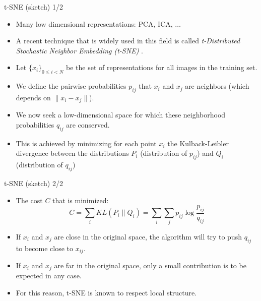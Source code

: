 \documentclass[xcolor=pdftex,dvipsnames,table]{beamer}
\begin{document}
\begin{frame}{t-SNE (sketch) 1/2}
\begin{itemize}
	\item Many low dimensional representations: PCA, ICA, $\ldots$
	\item A recent technique that is widely used in this field is called \emph{t-Distributed Stochastic Neighbor Embedding (t-SNE)} \cite{Maaten:2008}. 
	\item Let $\{x_i\}_{0\leq i < N}$ be the set of representations for all images in the training set. 
	\item We define the pairwise probabilities $p_{ij}$ that $x_i$ and $x_j$ are neighbors (which depends on $\|x_i-x_j\|$). 
	\item We now seek a low-dimensional space for which these neighborhood probabilities $q_{ij}$ are conserved. 
	\item This is achieved by minimizing for each point $x_i$ the Kulback-Leibler divergence between the distributions $P_i$ (distribution of $p_{ij}$) and $Q_i$ (distribution of $q_{ij}$)
\end{itemize}
\end{frame}

\begin{frame}{t-SNE (sketch) 2/2}
\begin{itemize}
	\item The cost $C$ that is minimized: 
	\begin{equation}
		C = \sum_i KL(P_i\|Q_i) = \sum_i \sum_j p_{ij}\log{\frac{p_{ij}}{q_{ij}}}
	\end{equation}
	\item If $x_i$ and $x_j$ are close in the original space, the algorithm will try to push $q_{ij}$ to become close to $x_{ij}$. 
	\item If $x_i$ and $x_j$ are far in the original space, only a small contribution is to be expected in any case. 
	\item For this reason, t-SNE is known to respect local structure.  	
\end{itemize}
\end{frame}
\end{document}
